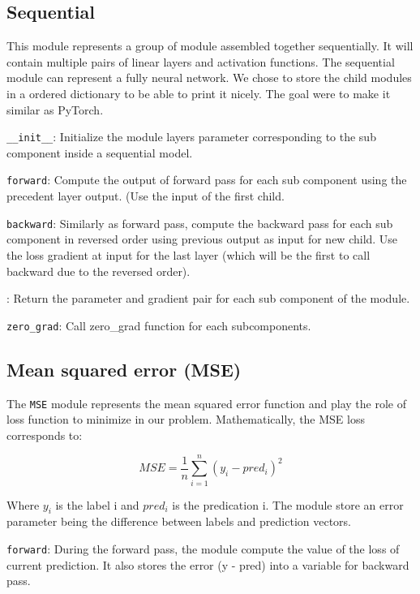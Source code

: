 \documentclass[10pt,conference,compsocconf]{IEEEtran}
\begin{document}
\subsection{Sequential}

This module represents a group of module assembled together sequentially. It will contain multiple pairs of linear layers and activation functions. The sequential module can represent a fully neural network. We chose to store the child modules in a ordered dictionary to be able to print it nicely. The goal were to make it similar as PyTorch. 

\texttt{\_\_init\_\_}: Initialize the module layers parameter corresponding to the sub component inside a sequential model. 

\texttt{forward}: Compute the output of forward pass for each sub component using the precedent layer output. (Use the input of the first child.

\texttt{backward}: Similarly as forward pass, compute the backward pass for each sub component in reversed order using previous output as input for new child. Use the loss gradient at input for the last layer (which will be the first to call backward due to the reversed order). 

: Return the parameter and gradient pair for each sub component of the module. 

\texttt{zero\_grad}: Call zero\_grad function for each subcomponents.

\subsection{Mean squared error (MSE)}

The \texttt{MSE} module represents the mean squared error function and play the role of loss function to minimize in our problem. Mathematically, the MSE loss corresponds to:

\begin{equation}
    MSE = \frac{1}{n}\sum_{i=1}^{n} (y_i - pred_i)^2
\end{equation}

Where $y_i$ is the label i and $pred_i$ is the predication i.
The module store an error parameter being the difference between labels and prediction vectors.

\texttt{forward}: During the forward pass, the module compute the value of the loss of current prediction. It also stores the error (y - pred) into a variable for backward pass.
\end{document}

